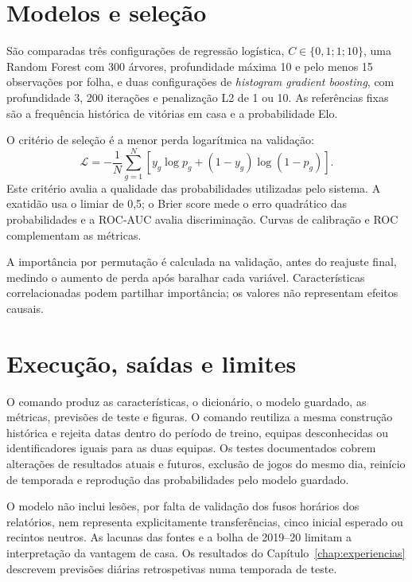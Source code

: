 \section{Modelos e seleção}

São comparadas três configurações de regressão logística,
\(C\in\{0{,}1;1;10\}\), uma Random Forest com 300 árvores, profundidade
máxima 10 e pelo menos 15 observações por folha, e duas configurações de
\emph{histogram gradient boosting}, com profundidade 3, 200 iterações e
penalização L2 de 1 ou 10. As referências fixas são a frequência histórica
de vitórias em casa e a probabilidade Elo.

O critério de seleção é a menor perda logarítmica na validação:
\[
\mathcal{L}=-\frac{1}{N}\sum_{g=1}^{N}
\left[y_g\log p_g+(1-y_g)\log(1-p_g)\right].
\]
Este critério avalia a qualidade das probabilidades utilizadas pelo
sistema. A exatidão usa o limiar de 0,5; o Brier score mede o erro
quadrático das probabilidades e a ROC-AUC avalia discriminação. Curvas
de calibração e ROC complementam as métricas.

A importância por permutação é calculada na validação, antes do reajuste
final, medindo o aumento de perda após baralhar cada variável.
Características correlacionadas podem partilhar importância; os valores
não representam efeitos causais.

\section{Execução, saídas e limites}

O comando  produz as características,
o dicionário, o modelo guardado, as métricas, previsões de teste e figuras.
O comando  reutiliza a mesma construção
histórica e rejeita datas dentro do período de treino, equipas desconhecidas
ou identificadores iguais para as duas equipas. Os testes documentados
cobrem alterações de resultados atuais e futuros, exclusão de jogos do
mesmo dia, reinício de temporada e reprodução das probabilidades pelo
modelo guardado.

O modelo não inclui lesões, por falta de validação dos fusos horários dos
relatórios, nem representa explicitamente transferências, cinco inicial
esperado ou recintos neutros. As lacunas das fontes e a bolha de 2019--20
limitam a interpretação da vantagem de casa. Os resultados do
Capítulo~\ref{chap:experiencias} descrevem previsões diárias retrospetivas
numa temporada de teste.
